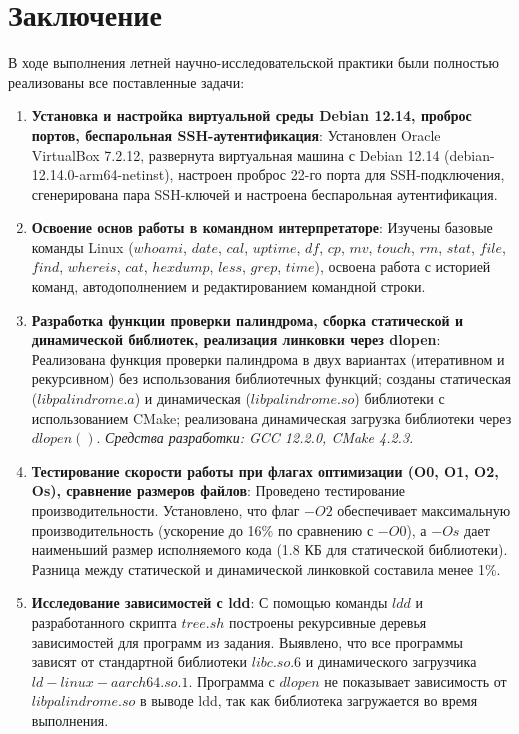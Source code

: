\documentclass[14pt]{extreport}
\begin{document}
{\newpage
{\centering\section*{Заключение}}
В ходе выполнения летней научно-исследовательской практики были полностью реализованы все поставленные задачи:
\begin{enumerate}
    \item \textbf{Установка и настройка виртуальной среды Debian 12.14, проброс портов, беспарольная SSH-аутентификация}: 
    Установлен Oracle VirtualBox 7.2.12, развернута виртуальная машина с Debian 12.14 (debian-12.14.0-arm64-netinst), настроен проброс 22-го порта для SSH-подключения, сгенерирована пара SSH-ключей и настроена беспарольная аутентификация.

    \item \textbf{Освоение основ работы в командном интерпретаторе}: 
    Изучены базовые команды Linux ($whoami$, $date$, $cal$, $uptime$, $df$, $cp$, $mv$, $touch$, $rm$, $stat$, $file$, $find$, $whereis$, $cat$, $hexdump$, $less$, $grep$, $time$), освоена работа с историей команд, автодополнением и редактированием командной строки.

    \item \textbf{Разработка функции проверки палиндрома, сборка статической и динамической библиотек, реализация линковки через dlopen}: 
    Реализована функция проверки палиндрома в двух вариантах (итеративном и рекурсивном) без использования библиотечных функций; созданы статическая ($libpalindrome.a$) и динамическая ($libpalindrome.so$) библиотеки с использованием CMake; реализована динамическая загрузка библиотеки через $dlopen()$. \textit{Средства разработки: GCC 12.2.0, CMake 4.2.3.}

    \item \textbf{Тестирование скорости работы при флагах оптимизации (O0, O1, O2, Os), сравнение размеров файлов}: 
    Проведено тестирование производительности. Установлено, что флаг $-O2$ обеспечивает максимальную производительность (ускорение до 16\% по сравнению с $-O0$), а $-Os$ дает наименьший размер исполняемого кода (1.8 КБ для статической библиотеки). Разница между статической и динамической линковкой составила менее 1\%.

    \item \textbf{Исследование зависимостей с ldd}: 
    С помощью команды $ldd$ и разработанного скрипта $tree.sh$ построены рекурсивные деревья зависимостей для программ из задания. Выявлено, что все программы зависят от стандартной библиотеки $libc.so.6$ и динамического загрузчика $ld-linux-aarch64.so.1$. Программа с $dlopen$ не показывает зависимость от $libpalindrome.so$ в выводе ldd, так как библиотека загружается во время выполнения.


\end{enumerate}}
\end{document}
